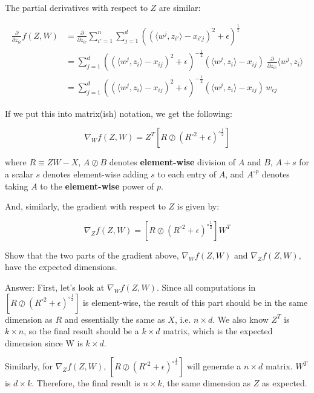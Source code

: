 \documentclass{article}
\newcommand{\blu}[1]{{\textcolor{blu}{#1}}}
\newenvironment{answer}{\par\begingroup\color{gre}Answer: }{\endgroup}
\let\ask\blu
\begin{document}
The partial derivatives with respect to $Z$ are similar:

\begin{align*}
\frac{\partial}{\partial z_{ic}} f(Z,W)
  &= \frac{\partial}{\partial z_{ic}} \sum_{i'=1}^n \sum_{j=1}^d  \left( (\langle w^j, z_{i'}\rangle - x_{i'j})^2 + \epsilon \right)^{\frac12}\\
  &= \sum_{j=1}^d  \left( (\langle w^j, z_{i}\rangle - x_{ij})^2 + \epsilon \right)^{-\frac12}   (\langle w^j, z_{i}\rangle - x_{ij}) \; \frac{\partial}{\partial z_{ic}} \langle w^j, z_i\rangle \\
  &= \sum_{j=1}^d  \left( (\langle w^j, z_i\rangle - x_{ij})^2 + \epsilon \right)^{-\frac12}  (\langle w^j, z_i\rangle - x_{ij}) \, w_{cj}
\end{align*}

If we put this into matrix(ish) notation, we get the following:

\[
\nabla_W f(Z,W) = Z^T \left[ R \oslash \left(R^{\circ 2} + \epsilon\right)^{\circ \frac12}  \right]
\]

where $R\equiv ZW-X$,
$A \oslash B$ denotes \textbf{element-wise} division of $A$ and $B$,
$A + s$ for a scalar $s$ denotes element-wise adding $s$ to each entry of $A$,
and $A^{\circ p}$ denotes taking $A$ to the \textbf{element-wise} power of $p$.

And, similarly, the gradient with respect to $Z$ is given by:

\[
\nabla_Z f(Z,W) = \left[ R \oslash \left(R^{\circ 2} + \epsilon\right)^{\circ \frac12} \right] W^T
\]

\ask{Show that the two parts of the gradient above, $\nabla_W f(Z,W)$ and $\nabla_Z f(Z,W)$, have the expected dimensions.}
\begin{answer}
	First, let's look at $\nabla_W f(Z,W)$. Since all computations in $\left[ R \oslash \left(R^{\circ 2} + \epsilon\right)^{\circ \frac12}  \right]$ is element-wise, the result of this part should be in the same dimension as $R$ and essentially the same as $X$, i.e. $n \times d$. We also know $Z^T$ is $k \times n$, so the final result should be a $k \times d$ matrix, which is the expected dimension since W is $k \times d$.

	Similarly, for $\nabla_Z f(Z,W)$, $\left[ R \oslash \left(R^{\circ 2} + \epsilon\right)^{\circ \frac12} \right]$ will generate a $n \times d$ matrix. $W^T$ is $d \times k$. Therefore, the final result is $n \times k$, the same dimension as $Z$ as expected.
\end{answer}
\end{document}
